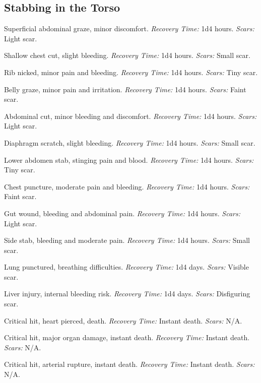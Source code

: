 \documentclass[12pt]{book}  %
\begin{document}
\subsection{Stabbing in the Torso}

\begin{description}[labelwidth=1.5em, leftmargin=*, itemsep=0.4em]
    \item[1 -] Superficial abdominal graze, minor discomfort. \textit{Recovery Time:} 1d4 hours. \textit{Scars:} Light scar.
    \item[2 -] Shallow chest cut, slight bleeding. \textit{Recovery Time:} 1d4 hours. \textit{Scars:} Small scar.
    \item[3 -] Rib nicked, minor pain and bleeding. \textit{Recovery Time:} 1d4 hours. \textit{Scars:} Tiny scar.
    \item[4 -] Belly graze, minor pain and irritation. \textit{Recovery Time:} 1d4 hours. \textit{Scars:} Faint scar.
    \item[5 -] Abdominal cut, minor bleeding and discomfort. \textit{Recovery Time:} 1d4 hours. \textit{Scars:} Light scar.
    \item[6 -] Diaphragm scratch, slight bleeding. \textit{Recovery Time:} 1d4 hours. \textit{Scars:} Small scar.
    \item[7 -] Lower abdomen stab, stinging pain and blood. \textit{Recovery Time:} 1d4 hours. \textit{Scars:} Tiny scar.
    \item[8 -] Chest puncture, moderate pain and bleeding. \textit{Recovery Time:} 1d4 hours. \textit{Scars:} Faint scar.
    \item[9 -] Gut wound, bleeding and abdominal pain. \textit{Recovery Time:} 1d4 hours. \textit{Scars:} Light scar.
    \item[10 -] Side stab, bleeding and moderate pain. \textit{Recovery Time:} 1d4 hours. \textit{Scars:} Small scar.
    \item[11 -] Lung punctured, breathing difficulties. \textit{Recovery Time:} 1d4 days. \textit{Scars:} Visible scar.
    \item[12 -] Liver injury, internal bleeding risk. \textit{Recovery Time:} 1d4 days. \textit{Scars:} Disfiguring scar.
    \item[13 -] Critical hit, heart pierced, death. \textit{Recovery Time:} Instant death. \textit{Scars:} N/A.
    \item[14 -] Critical hit, major organ damage, instant death. \textit{Recovery Time:} Instant death. \textit{Scars:} N/A.
    \item[15 -] Critical hit, arterial rupture, instant death. \textit{Recovery Time:} Instant death. \textit{Scars:} N/A.

\end{description}
\end{document}
